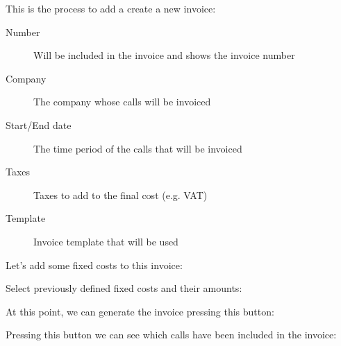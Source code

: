 \documentclass[letterpaper,10pt,english]{sphinxmanual}
\begin{document}
This is the process to add a create a new invoice:

\begin{description}
\item[{Number}] \leavevmode{}\label{billing_and_invoices/invoices:term-number}
Will be included in the invoice and shows the invoice number

\item[{Company}] \leavevmode{}\label{billing_and_invoices/invoices:term-company}
The company whose calls will be invoiced

\item[{Start/End date}] \leavevmode{}\label{billing_and_invoices/invoices:term-start-end-date}
The time period of the calls that will be invoiced

\item[{Taxes}] \leavevmode{}\label{billing_and_invoices/invoices:term-taxes}
Taxes to add to the final cost (e.g. VAT)

\item[{Template}] \leavevmode{}\label{billing_and_invoices/invoices:term-template}
Invoice template that will be used

\end{description}

Let's add some fixed costs to this invoice:


Select previously defined fixed costs and their amounts:


At this point, we can generate the invoice pressing this button:


Pressing this button we can see which calls have been included in the invoice:
\end{document}
